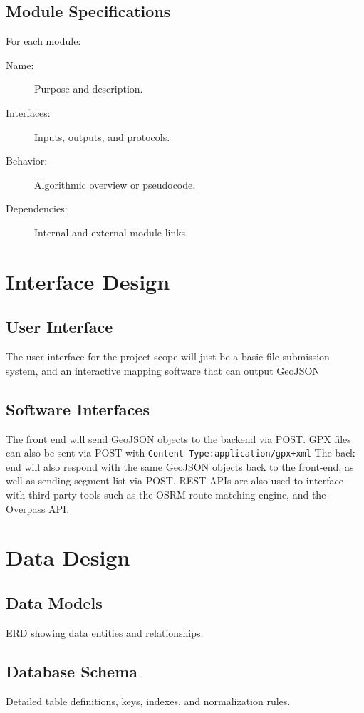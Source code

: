 \documentclass[11pt,a4paper]{report}
\begin{document}
\subsection{Module Specifications}
For each module:
\begin{description}
	\item[Name:] Purpose and description.
	\item[Interfaces:] Inputs, outputs, and protocols.
	\item[Behavior:] Algorithmic overview or pseudocode.
	\item[Dependencies:] Internal and external module links.
\end{description}

\section{Interface Design}
\subsection{User Interface}
The user interface for the project scope will just be a basic file submission system, and an interactive mapping software that can output GeoJSON
\subsection{Software Interfaces}
The front end will send GeoJSON objects to the backend via POST. GPX files can also be sent via POST with \texttt{\small Content-Type:application/gpx+xml}
The back-end will also respond with the same GeoJSON objects back to the front-end, as well as sending segment list via POST.
REST APIs are also used to interface with third party tools such as the OSRM route matching engine, and the Overpass API.

\section{Data Design}
\subsection{Data Models}
ERD showing data entities and relationships.

\subsection{Database Schema}
Detailed table definitions, keys, indexes, and normalization rules.
\end{document}
